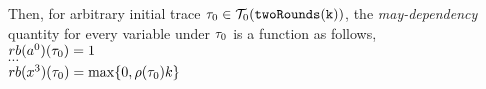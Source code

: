 \begin{example}
\begin{itemize}
    Then, for arbitrary initial trace $\mathtt{\tau}_0 \in \mathcal{T}_0(\mathtt{twoRounds(k)})$,
    the \emph{may-dependency} quantity for every variable under $\mathtt{\tau}_0$ is a function
    as follows,
    \\
    $rb(a^0) (\mathtt{\tau}_0)  = 1$
    \\
    $\cdots$
    \\
    $rb(x^3) (\mathtt{\tau}_0)  = \max\{0, \rho(\mathtt{\tau}_0) k \} $
\end{itemize}
\end{example}